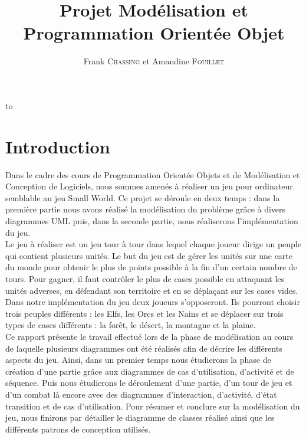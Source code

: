 \documentclass[a4paper,11pt]{article}
\author{}
\title{}
\title{\LARGE{Projet Modélisation et Programmation Orientée Objet}}
\author{Frank \textsc{Chassing} et Amandine \textsc{Fouillet}}
\makeatletter
\def\clap#1{\hbox to 0pt{\hss #1\hss}}%
\def\haut#1#2#3{%
\hbox to \hsize{%
\rlap{\vtop{\raggedright #1}}%
\hss
\clap{\vtop{\centering #2}}%
\hss
\llap{\vtop{\raggedleft #3}}}}%
\def\bas#1#2#3{%
\hbox to \hsize{%
\rlap{\vbox{\raggedright #1}}%
\hss
\clap{\vbox{\centering #2}}%
\hss
\llap{\vbox{\raggedleft #3}}}}%
\def\maketitle{%
\thispagestyle{empty}\vbox to \vsize{%
\haut{}{\@blurb}{}
\vfill
\vspace{1cm}
\begin{flushleft}
\usefont{OT1}{ptm}{m}{n}
\huge \@title
\end{flushleft}
\par
\hrule height 4pt
\par
\begin{flushright}
\usefont{OT1}{phv}{m}{n}
\Large \@author
\par
\end{flushright}
\vspace{1cm}
\vfill
\vfill
\bas{}{\@location, le \@date}{}
}%
\cleardoublepage
}
\makeatother
\begin{document}
\maketitle
\tableofcontents
\newpage

\section*{Introduction}
	Dans le cadre des cours de Programmation Orientée Objets et de Modélisation et Conception de Logiciels, nous sommes amenés à réaliser un jeu pour ordinateur semblable au jeu Small World. Ce projet se déroule en deux temps : dans la première partie nous avons réalisé la modélisation du problème grâce à divers diagrammes UML puis, dans la seconde partie, nous réaliserons l'implémentation du jeu. \\

	Le jeu à réaliser est un jeu tour à tour dans lequel chaque joueur dirige un peuple qui contient plusieurs unités. Le but du jeu est de gérer les unités sur une carte du monde pour obtenir le plus de points possible à la fin d'un certain nombre de tours. Pour gagner, il faut contrôler le plus de cases possible en attaquant les unités adverses, en défendant son territoire et en se déplaçant sur les cases vides. Dans notre implémentation du jeu deux joueurs s'opposeront. Ils pourront choisir trois peuples différents : les Elfs, les Orcs et les Nains et se déplacer sur trois types de cases différents : la forêt, le désert, la montagne et la plaine.\\

	Ce rapport présente le travail effectué lors de la phase de modélisation au cours de laquelle plusieurs diagrammes ont été réalisés afin de décrire les différents aspects du jeu. Ainsi, dans un premier temps nous étudierons la phase de création d'une partie grâce aux diagrammes de cas d'utilisation, d'activité et de séquence. Puis nous étudierons le déroulement d'une partie, d'un tour de jeu et d'un combat là encore avec des diagrammes d'interaction, d'activité, d'état transition et de cas d'utilisation. Pour résumer et conclure sur la modélisation du jeu, nous finirons par détailler le diagramme de classes réalisé ainsi que les différents patrons de conception utilisés.
	\newpage
\end{document}

